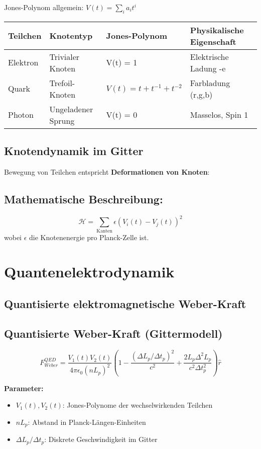 \documentclass{article}
\begin{document}
Jones-Polynom allgemein: $ V(t) = \sum_{i} a_i t^i $

\begin{table}[H]
    \centering
    \begin{tabular}{lp{3cm}lp{4cm}}
        \toprule
        Teilchen & Knotentyp & Jones-Polynom & Physikalische Eigenschaft \\
        \midrule
        Elektron & Trivialer Knoten & V(t) = 1 & Elektrische Ladung -e \\
        Quark & Trefoil-Knoten & $V(t) = t + t^{-1} + t^{-2}$ & Farbladung (r,g,b) \\
        Photon & Ungeladener Sprung & V(t) = 0 & Masselos, Spin 1 \\
        \bottomrule
    \end{tabular}
\end{table}

\subsection*{Knotendynamik im Gitter}
Bewegung von Teilchen entspricht \textbf{Deformationen von Knoten}:

\subsection*{Mathematische Beschreibung:}
\[ \mathcal{H} = \sum_{\text{Kanten}} \epsilon (V_i(t) - V_j(t))^2 \]
wobei $ \epsilon $ die Knotenenergie pro Planck-Zelle ist.

\section{Quantenelektrodynamik}
\subsection*{Quantisierte elektromagnetische Weber-Kraft}
\subsection*{Quantisierte Weber-Kraft (Gittermodell)}
\[ F_{Weber}^{QED} = \frac{V_1(t) V_2(t)}{4\pi\epsilon_0 (nL_p)^2} \left(1 - \frac{(\Delta L_p / \Delta t_p)^2}{c^2} + \frac{2 L_p \Delta^2 L_p}{c^2 \Delta t_p^2}\right)\hat{r} \]

\textbf{Parameter:}
\begin{itemize}
    \item $V_1(t), V_2(t)$: Jones-Polynome der wechselwirkenden Teilchen
    \item $nL_p$: Abstand in Planck-Längen-Einheiten
    \item $\Delta L_p / \Delta t_p$: Diskrete Geschwindigkeit im Gitter
\end{itemize}
\end{document}
